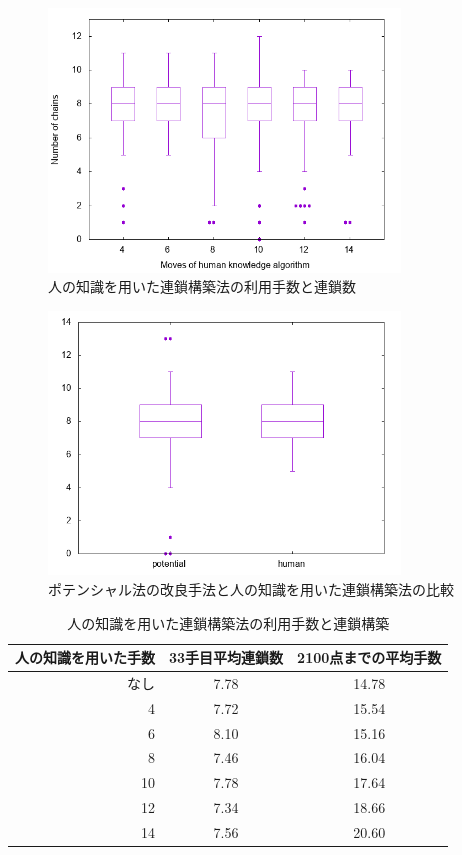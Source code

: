 \documentclass[12pt]{jreport}
\begin{document}
\begin{figure}[tbp]
  \begin{center}
  \includegraphics[height=7cm]{experiment/HumanKnowledge/human_chain.png}
  \caption{人の知識を用いた連鎖構築法の利用手数と連鎖数} \label{fig:human_chain}
\end{center}
\end{figure}


\begin{figure}[tbp]
  \begin{center}
  \includegraphics[height=7cm]{experiment/HumanKnowledge/chain_poten_human.png}
  \caption{ポテンシャル法の改良手法と人の知識を用いた連鎖構築法の比較} \label{fig:chain_poten_human}
\end{center}
\end{figure}


\begin{table}[tbp]
\begin{center}
\caption{人の知識を用いた連鎖構築法の利用手数と連鎖構築} \label{tab:human}
  \begin{tabular}{|r|c|c|} \hline
人の知識を用いた手数 & 33手目平均連鎖数 & 2100点までの平均手数\\ \hline
なし& 7.78 & 14.78\\ \hline
 4 & 7.72 & 15.54\\ \hline
 6 & 8.10 & 15.16\\ \hline
 8 & 7.46 & 16.04\\ \hline
10 & 7.78 & 17.64\\ \hline
12 & 7.34 & 18.66\\ \hline
14 & 7.56 & 20.60\\ \hline
\end{tabular}
\end{center}
\end{table}
\end{document}
